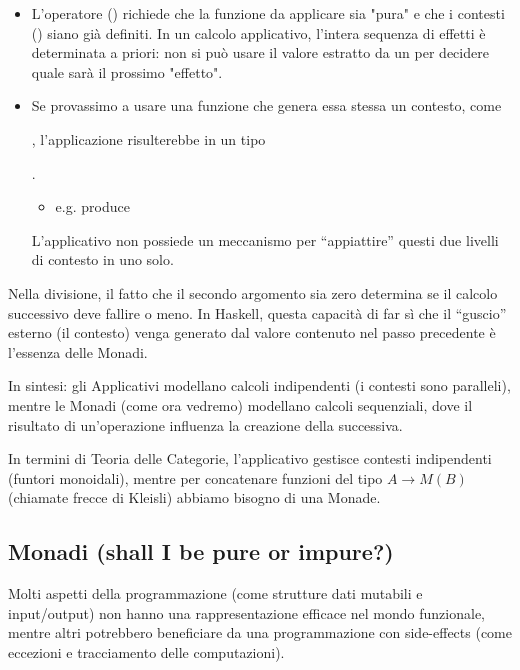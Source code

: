 \begin{itemize}
    \item L'operatore \code{<*>} () richiede che la funzione da applicare sia "pura" e che i contesti () siano già definiti. In un calcolo applicativo, l'intera sequenza di effetti è determinata a priori: non si può usare il valore estratto da un  per decidere quale sarà il prossimo "effetto".
    
    \item Se provassimo a usare una funzione che genera essa stessa un contesto, come 

        , l'applicazione risulterebbe in un tipo

        . 
    \begin{itemize}
        \item e.g.  produce 
    \end{itemize}
    L'applicativo non possiede un meccanismo per ``appiattire'' questi due livelli di contesto in uno solo.
    
\end{itemize}
 Nella divisione, il fatto che il secondo argomento sia zero determina se il calcolo successivo deve fallire o meno. In Haskell, questa capacità di far sì che il ``guscio'' esterno (il contesto) venga generato dal valore contenuto nel passo precedente è l'essenza delle Monadi.

    In sintesi: gli Applicativi modellano calcoli indipendenti (i contesti sono paralleli), mentre le Monadi (come ora vedremo) modellano calcoli sequenziali, dove il risultato di un'operazione influenza la creazione della successiva.

\begin{gframe}{}
In termini di Teoria delle Categorie, l'applicativo gestisce contesti indipendenti (funtori monoidali), mentre per concatenare funzioni del tipo $A \to M(B)$ (chiamate frecce di Kleisli) abbiamo bisogno di una Monade.
\end{gframe}

\subsection{Monadi (shall I be pure or impure?)}
Molti aspetti della programmazione (come strutture dati mutabili e input/output) non hanno una rappresentazione efficace nel mondo funzionale, mentre altri potrebbero beneficiare da una programmazione con side-effects (come eccezioni e tracciamento delle computazioni).

